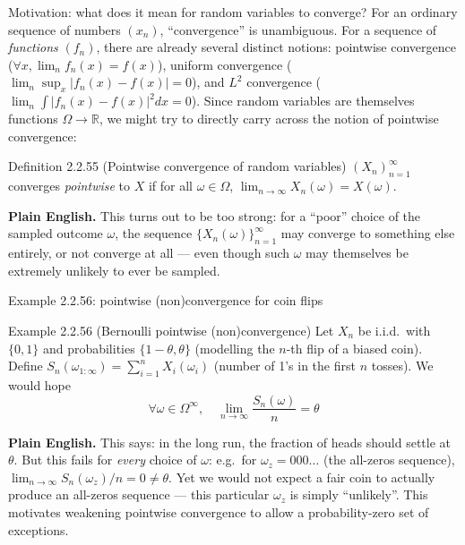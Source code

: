 \documentclass[aspectratio=169,10pt]{beamer}
\begin{document}
\begin{frame}{Motivation: what does it mean for random variables to converge?}
For an ordinary sequence of numbers $(x_n)$, ``convergence'' is unambiguous.
For a sequence of \emph{functions} $(f_n)$, there are already several
distinct notions: pointwise convergence ($\forall x, \lim_n f_n(x)=f(x)$),
uniform convergence ($\lim_n \sup_x |f_n(x)-f(x)|=0$), and $L^2$ convergence
($\lim_n\int|f_n(x)-f(x)|^2dx=0$). Since random variables are themselves
functions $\Omega\to\mathbb{R}$, we might try to directly carry across the
notion of pointwise convergence:

\begin{block}{Definition 2.2.55 (Pointwise convergence of random variables)}
$(X_n)_{n=1}^{\infty}$ converges \emph{pointwise} to $X$ if for all
$\omega\in\Omega$, $\lim_{n\to\infty}X_n(\omega)=X(\omega)$.
\end{block}
\textbf{Plain English.} This turns out to be too strong: for a ``poor''
choice of the sampled outcome $\omega$, the sequence
$\{X_n(\omega)\}_{n=1}^{\infty}$ may converge to something else entirely, or
not converge at all --- even though such $\omega$ may themselves be
extremely unlikely to ever be sampled.
\end{frame}

\begin{frame}{Example 2.2.56: pointwise (non)convergence for coin flips}
\begin{block}{Example 2.2.56 (Bernoulli pointwise (non)convergence)}
Let $X_n$ be i.i.d.\ with $\{0,1\}$ and probabilities $\{1-\theta,\theta\}$
(modelling the $n$-th flip of a biased coin). Define
$S_n(\omega_{1:\infty}) = \sum_{i=1}^n X_i(\omega_i)$ (number of 1's in the
first $n$ tosses). We would hope
\[ \forall \omega\in\Omega^\infty, \quad \lim_{n\to\infty}\frac{S_n(\omega)}{n} = \theta \]
\end{block}
\textbf{Plain English.} This says: in the long run, the fraction of heads
should settle at $\theta$. But this fails for \emph{every} choice of
$\omega$: e.g.\ for $\omega_z = 000\ldots$ (the all-zeros sequence),
$\lim_{n\to\infty}S_n(\omega_z)/n = 0 \neq \theta$. Yet we would not expect a
fair coin to actually produce an all-zeros sequence --- this particular
$\omega_z$ is simply ``unlikely''. This motivates weakening pointwise
convergence to allow a probability-zero set of exceptions.
\end{frame}
\end{document}
